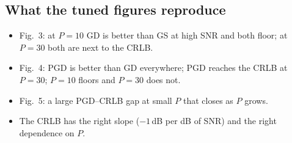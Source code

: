 \documentclass[11pt,a4paper]{article}
\begin{document}
\subsection{What the tuned figures reproduce}
\begin{itemize}[leftmargin=*,itemsep=1pt]
  \item Fig.~3: at $P=10$ GD is better than GS at high SNR and both floor; at $P=30$ both are next
        to the CRLB.
  \item Fig.~4: PGD is better than GD everywhere; PGD reaches the CRLB at $P=30$; $P=10$ floors and
        $P=30$ does not.
  \item Fig.~5: a large PGD--CRLB gap at small $P$ that closes as $P$ grows.
  \item The CRLB has the right slope ($-1$\,dB per dB of SNR) and the right dependence on $P$.
\end{itemize}
\end{document}
